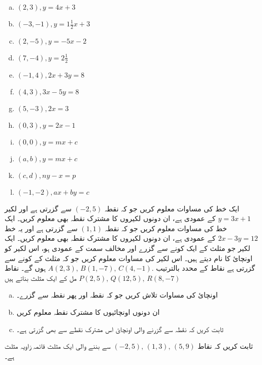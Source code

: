 \begin{multicols}{3}
\begin{enumerate}[a.]
\item \((2,3),  y=4x+3 \)
\item \((-3,-1), y=1\frac{1}{2}x+3 \)
\item \((2,-5),   y=-5x-2 \)
\item \((7,-4), y=2\frac{1}{2} \)
\item \((-1,4),  2x+3y=8 \)
\item \((4,3),  3x-5y=8 \)
\item \((5,-3),   2x=3 \)
\item \((0,3),   y=2x-1 \)
\item \((0,0),  y=mx+c \)
\item \((a,b),  y=mx+c \)
\item \((c,d),  ny-x=p \)
\item \((-1,-2), ax+by=c \)
\end{enumerate}
\end{multicols}
ایک خط کی مساوات معلوم کریں جو کہ نقطہ \( (-2,5) \)  سے گزرتی ہے اور لکیر  \( y=3x+1 \)  کے عمودی ہے، ان دونوں لکیروں کا مشترک نقطہ بھی معلوم کریں۔
ایک خط کی مساوات معلوم کریں جو کہ نقطہ \( (1,1) \)  سے گزرتی ہے اور یہ خط \( 2x-3y=12 \) کے عمودی ہے، ان دونوں لکیروں کا مشترک نقطہ بھی معلوم کریں۔             
ایک لکیر جو مثلث کے ایک کونے سے گزرے اور مخالف سمت کے عمودی ہو، اس لکیر کو اونچائ کا نام دیتے ہیں۔  اس لکیر کی مساوات معلوم کریں جو کہ مثلث  کے  کونے  سے گزرتی ہے نقاط کے محدد بالترتیب \( A(2,3), \, B(1,-7), \, C(4,-1). \) ہوں گے۔
نقاط \( P(2,5), \, Q(12,5), \, R(8,-7) \) مل کے ایک مثلث بناتے ہیں
\begin{multicols}{2}
\begin{enumerate}[a.]
\item
اونچائ کی مساوات تلاش کریں جو کہ نقطہ  اور پھر نقطہ  سے گزرے۔  
\item
ان دونوں اونچائیوں کا مشترک نقطہ معلوم کریں
\item
ثابت کریں کہ نقطہ  سے گزرنے والی اونچائ اس مشترک نقطے سے بھی گزرتی ہے۔ 
\end{enumerate}
\end{multicols}
ثابت کریں کہ نقاط \( (-2,5) , \, (1,3), \, (5,9) \) سے بننے والی ایک مثلث قائمہ زاویہ مثلث ہے۔
